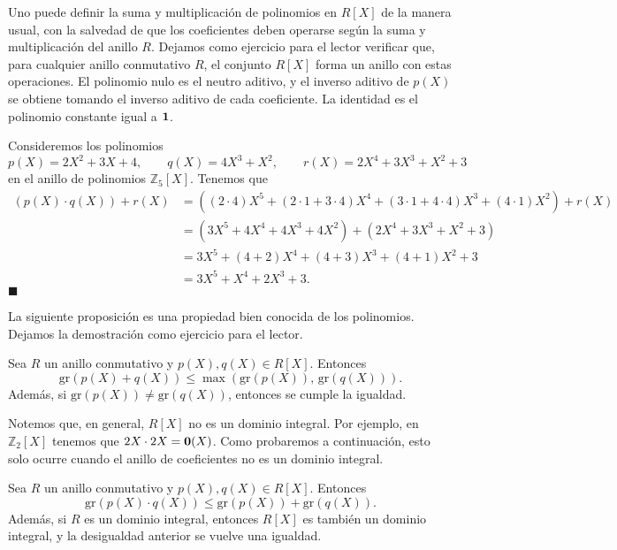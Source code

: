 Uno puede definir la suma y multiplicación de polinomios en $R[X]$ de la manera usual, con la salvedad de que los coeficientes deben operarse según la suma y multiplicación del anillo $R$. Dejamos como ejercicio para el lector verificar que, para cualquier anillo conmutativo $R$, el conjunto $R[X]$ forma un anillo con estas operaciones. El polinomio nulo es el neutro aditivo, y el inverso aditivo de $p(X)$ se obtiene tomando el inverso aditivo de cada coeficiente. La identidad es el polinomio constante igual a $\mathbf{1}$.

\begin{example}
Consideremos los polinomios 
$$p(X) = 2X^2 + 3X + 4, \qquad q(X) = 4X^3 + X^2, \qquad r(X) = 2X^4 + 3X^3 + X^2 + 3$$
en el anillo de polinomios $\mathbb{Z}_5[X]$. Tenemos que
\begin{align*}
(p(X) \cdot q(X)) + r(X) &= \left((2 \cdot 4)X^5 + (2 \cdot 1 + 3 \cdot 4)X^4 + (3 \cdot 1 + 4 \cdot 4)X^3 + (4 \cdot 1)X^2 \right) + r(X) \\
&= (3X^5 + 4X^4 + 4X^3 + 4X^2) + (2X^4 + 3X^3 + X^2 + 3) \\
&= 3X^5 + (4 + 2)X^4 + (4 + 3)X^3 + (4 + 1)X^2 + 3 \\
&= 3X^5 + X^4 + 2X^3 + 3.
\end{align*}
\hfill$\blacksquare$
\end{example}

La siguiente proposición es una propiedad bien conocida de los polinomios. Dejamos la demostración como ejercicio para el lector.

\begin{proposition}
Sea $R$ un anillo conmutativo y $p(X), q(X) \in R[X]$. Entonces
$$\mathrm{gr}(p(X) + q(X)) \leq \max\left( \mathrm{gr}(p(X)),\, \mathrm{gr}(q(X))\right).$$
Además, si $\mathrm{gr}(p(X)) \neq \mathrm{gr}(q(X))$, entonces se cumple la igualdad.
\end{proposition}


Notemos que, en general, $R[X]$ no es un dominio integral. Por ejemplo, en $\mathbb{Z}_2[X]$ tenemos que $2X \cdot 2X = \mathbf{0}(X)$. Como probaremos a continuación, esto solo ocurre cuando el anillo de coeficientes no es un dominio integral.

\begin{proposition}
Sea $R$ un anillo conmutativo y $p(X), q(X) \in R[X]$. Entonces
$$\mathrm{gr}(p(X) \cdot q(X)) \leq \mathrm{gr}(p(X)) + \mathrm{gr}(q(X)).$$
Además, si $R$ es un dominio integral, entonces $R[X]$ es también un dominio integral, y la desigualdad anterior se vuelve una igualdad.
\end{proposition}

